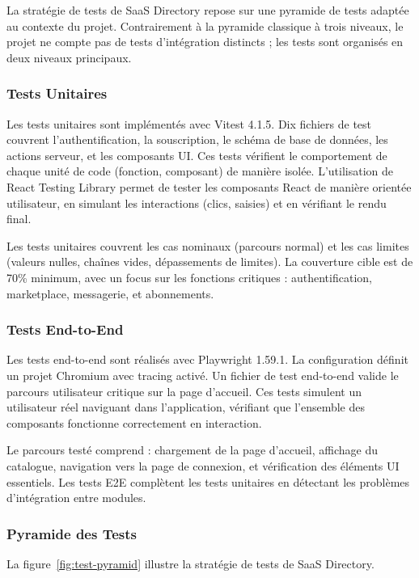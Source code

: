 La stratégie de tests de SaaS Directory repose sur une pyramide de tests adaptée au contexte du projet. Contrairement à la pyramide classique à trois niveaux, le projet ne compte pas de tests d'intégration distincts ; les tests sont organisés en deux niveaux principaux.

\subsubsection{Tests Unitaires}

Les tests unitaires sont implémentés avec Vitest 4.1.5. Dix fichiers de test couvrent l'authentification, la souscription, le schéma de base de données, les actions serveur, et les composants UI. Ces tests vérifient le comportement de chaque unité de code (fonction, composant) de manière isolée. L'utilisation de React Testing Library permet de tester les composants React de manière orientée utilisateur, en simulant les interactions (clics, saisies) et en vérifiant le rendu final.

Les tests unitaires couvrent les cas nominaux (parcours normal) et les cas limites (valeurs nulles, chaînes vides, dépassements de limites). La couverture cible est de 70\% minimum, avec un focus sur les fonctions critiques : authentification, marketplace, messagerie, et abonnements.

\subsubsection{Tests End-to-End}

Les tests end-to-end sont réalisés avec Playwright 1.59.1. La configuration définit un projet Chromium avec tracing activé. Un fichier de test end-to-end valide le parcours utilisateur critique sur la page d'accueil. Ces tests simulent un utilisateur réel naviguant dans l'application, vérifiant que l'ensemble des composants fonctionne correctement en interaction.

Le parcours testé comprend : chargement de la page d'accueil, affichage du catalogue, navigation vers la page de connexion, et vérification des éléments UI essentiels. Les tests E2E complètent les tests unitaires en détectant les problèmes d'intégration entre modules.

\subsubsection{Pyramide des Tests}

La figure~\ref{fig:test-pyramid} illustre la stratégie de tests de SaaS Directory.

